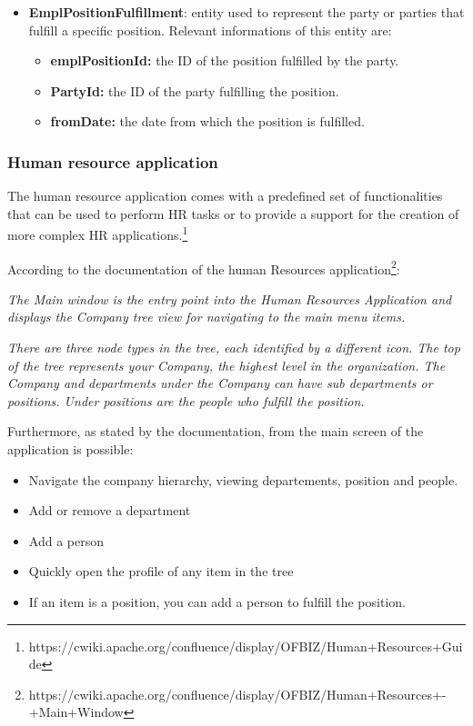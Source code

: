 \begin{itemize}
	\item \textbf{EmplPositionFulfillment}: entity used to represent the party or parties that fulfill a specific position.
	Relevant informations of this entity are:

		\begin{itemize}
			\item \textbf{emplPositionId:} the ID of the position fulfilled by the party.
			\item \textbf{PartyId:} the ID of the party fulfilling the position.
			\item \textbf{fromDate:} the date from which the position is fulfilled.
		\end{itemize}
\end{itemize}

\subsubsection{Human resource application}

The human resource application comes with a predefined set of functionalities that can be used to perform HR tasks or to provide a support for the creation of more complex HR applications.\footnote{https://cwiki.apache.org/confluence/display/OFBIZ/Human+Resources+Guide}

According to the documentation of the human Resources application\footnote{https://cwiki.apache.org/confluence/display/OFBIZ/Human+Resources+-+Main+Window}:

\textit{The Main window is the entry point into the Human Resources Application and displays the Company tree view for navigating to the main menu items.}

\textit{There are three node types in the tree, each identified by a different icon. The top of the tree represents your Company, the highest level in the organization. The Company and departments under the Company can have sub departments or positions. Under positions are the people who fulfill the position.}

Furthermore, as stated by the documentation, from the main screen of the application is possible:

\begin{itemize}
	\item Navigate the company hierarchy, viewing departements, position and people.
	\item Add or remove a department
	\item Add a person
	\item Quickly open the profile of any item in the tree
	\item If an item is a position, you can add a person to fulfill the position.
\end{itemize}

